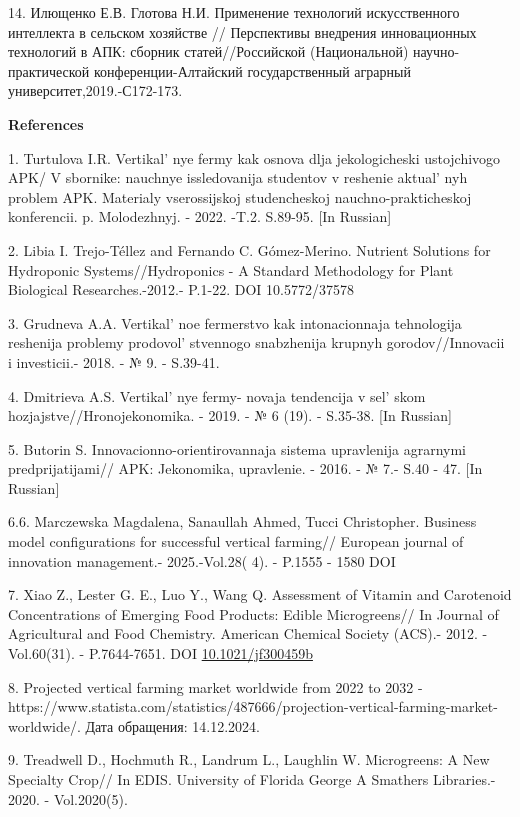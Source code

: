 14. Илющенко Е.В. Глотова Н.И. Применение технологий искусственного
интеллекта в сельском хозяйстве // Перспективы внедрения инновационных
технологий в АПК: сборник статей//Российской (Национальной)
научно-практической конференции-Алтайский государственный аграрный
университет,2019.-С172-173.

{\bfseries References}

1. Turtulova I.R. Vertikal' nye fermy kak osnova dlja
jekologicheski ustojchivogo APK/ V sbornike: nauchnye issledovanija
studentov v reshenie aktual' nyh problem APK. Materialy
vserossijskoj studencheskoj nauchno-prakticheskoj konferencii. p.
Molodezhnyj. - 2022. -T.2. S.89-95. {[}In Russian{]}

2. Libia I. Trejo-Téllez and Fernando C. Gómez-Merino. Nutrient Solutions
for Hydroponic Systems//Hydroponics - A Standard Methodology for Plant
Biological Researches.-2012.- P.1-22. DOI 10.5772/37578

3. Grudneva A.A. Vertikal' noe fermerstvo kak
intonacionnaja tehnologija reshenija problemy
prodovol' stvennogo snabzhenija krupnyh
gorodov//Innovacii i investicii.- 2018. - № 9. - S.39-41.

4. Dmitrieva A.S. Vertikal' nye fermy- novaja tendencija v
sel' skom hozjajstve//Hronojekonomika. - 2019. - № 6
(19). - S.35-38. {[}In Russian{]}

5. Butorin S. Innovacionno-orientirovannaja sistema upravlenija
agrarnymi predprijatijami// APK: Jekonomika, upravlenie. - 2016. - № 7.-
S.40 - 47. {[}In Russian{]}

6.6. Marczewska Magdalena, Sanaullah Ahmed, Tucci Christopher. Business
model configurations for successful vertical farming// European journal
of innovation management.- 2025.-Vol.28( 4). - P.1555 - 1580 DOI
\href{http://dx.doi.org/10.1108/EJIM-01-2023-0017}{}

7. Xiao Z., Lester G. E., Luo Y., Wang Q. Assessment of Vitamin and
Carotenoid Concentrations of Emerging Food Products: Edible
Microgreens// In Journal of Agricultural and Food Chemistry. American
Chemical Society (ACS).- 2012. -Vol.60(31). - P.7644-7651. DOI
\href{https://doi.org/10.1021/jf300459b}{10.1021/jf300459b}

8. Projected vertical farming market worldwide from 2022 to 2032 -
https://www.statista.com/statistics/487666/projection-vertical-farming-market-worldwide/.
Дата обращения: 14.12.2024.

9. Treadwell D., Hochmuth R., Landrum L., Laughlin W. Microgreens: A New
Specialty Crop// In EDIS. University of Florida George A Smathers
Libraries.- 2020. - Vol.2020(5).


